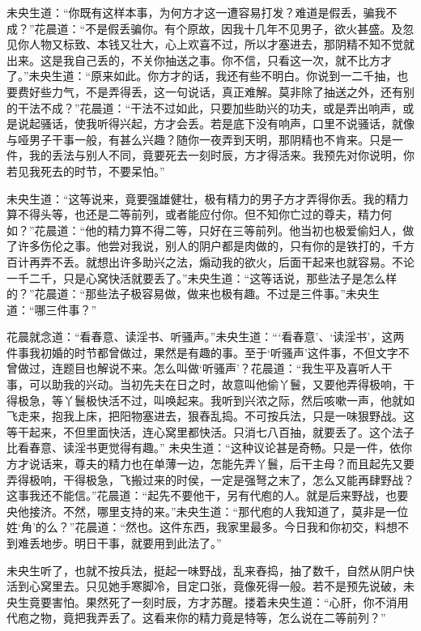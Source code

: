 \documentclass[a4paper,12pt,UTF8,twoside]{ctexbook}
\begin{document}
未央生道：“你既有这样本事，为何方才这一遭容易打发？难道是假丢，骗我不成？”花晨道：“不是假丢骗你。有个原故，因我十几年不见男子，欲火甚盛。及忽见你人物又标致、本钱又壮大，心上欢喜不过，所以才塞进去，那阴精不知不觉就出来。这是我自己丢的，不关你抽送之事。你不信，只看这一次，就不比方才了。”未央生道：“原来如此。你方才的话，我还有些不明白。你说到一二千抽，也要费好些力气，不是弄得丢，这一句说话，真正难解。莫非除了抽送之外，还有别的干法不成？”花晨道：“干法不过如此，只要加些助兴的功夫，或是弄出响声，或是说起骚话，使我听得兴起，方才会丢。若是底下没有响声，口里不说骚话，就像与哑男子干事一般，有甚么兴趣？随你一夜弄到天明，那阴精也不肯来。只是一件，我的丢法与别人不同，竟要死去一刻时辰，方才得活来。我预先对你说明，你若见我死去的时节，不要呆怕。”

未央生道：“这等说来，竟要强雄健壮，极有精力的男子方才弄得你丢。我的精力算不得头等，也还是二等前列，或者能应付你。但不知你亡过的尊夫，精力何如？”花晨道：“他的精力算不得二等，只好在三等前列。他当初也极爱偷妇人，做了许多伤伦之事。他尝对我说，别人的阴户都是肉做的，只有你的是铁打的，千方百计再弄不丢。就想出许多助兴之法，煽动我的欲火，后面干起来也就容易。不论一千二千，只是心窝快活就要丢了。”未央生道：“这等话说，那些法子是怎么样的？”花晨道：“那些法子极容易做，做来也极有趣。不过是三件事。”未央生道：“哪三件事？”

花晨就念道：“看春意、读淫书、听骚声。”未央生道：“‘看春意’、‘读淫书’，这两件事我初婚的时节都曾做过，果然是有趣的事。至于‘听骚声’这件事，不但文字不曾做过，连题目也解说不来。怎么叫做‘听骚声’？花晨道：“我生平及喜听人干事，可以助我的兴动。当初先夫在日之时，故意叫他偷丫鬟，又要他弄得极响，干得极急，等丫鬟极快活不过，叫唤起来。我听到兴浓之际，然后咳嗽一声，他就如飞走来，抱我上床，把阳物塞进去，狠舂乱捣。不可按兵法，只是一味狠野战。这等干起来，不但里面快活，连心窝里都快活。只消七八百抽，就要丢了。这个法子比看春意、读淫书更觉得有趣。” 未央生道：“这种议论甚是奇畅。只是一件，依你方才说话来，尊夫的精力也在单薄一边，怎能先弄丫鬟，后干主母？而且起先又要弄得极响，干得极急，飞搬过来的时侯，一定是强弩之末了，怎么又能再肆野战？这事我还不能信。”花晨道：“起先不要他干，另有代庖的人。就是后来野战，也要央他接济。不然，哪里支持的来。”未央生道：“那代庖的人我知道了，莫非是一位姓‘角’的么？”花晨道：“然也。这件东西，我家里最多。今日我和你初交，料想不到难丢地步。明日干事，就要用到此法了。”

未央生听了，也就不按兵法，挺起一味野战，乱来舂捣，抽了数千，自然从阴户快活到心窝里去。只见她手寒脚冷，目定口张，竟像死得一般。若不是预先说破，未央生竟要害怕。果然死了一刻时辰，方才苏醒。搂着未央生道：“心肝，你不消用代庖之物，竟把我弄丢了。这看来你的精力竟是特等，怎么说在二等前列？”
\end{document}
